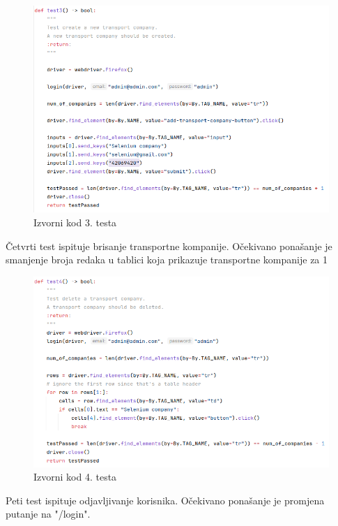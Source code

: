 			\begin{figure}[H]
				\includegraphics[width=\textwidth]{slike/selenium_test3.png}
				\centering
				\caption{Izvorni kod 3. testa}
				\label{fig:izvorni-kod-testa-3}
			\end{figure}
		
			Četvrti test ispituje brisanje transportne kompanije. Očekivano ponašanje je smanjenje broja redaka u tablici koja prikazuje transportne kompanije za 1
		
			\begin{figure}[H]
				\includegraphics[width=\textwidth]{slike/selenium_test4.png}
				\centering
				\caption{Izvorni kod 4. testa}
				\label{fig:izvorni-kod-testa-4}
			\end{figure}
		
			Peti test ispituje odjavljivanje korisnika. Očekivano ponašanje je promjena putanje na "/login".
			

